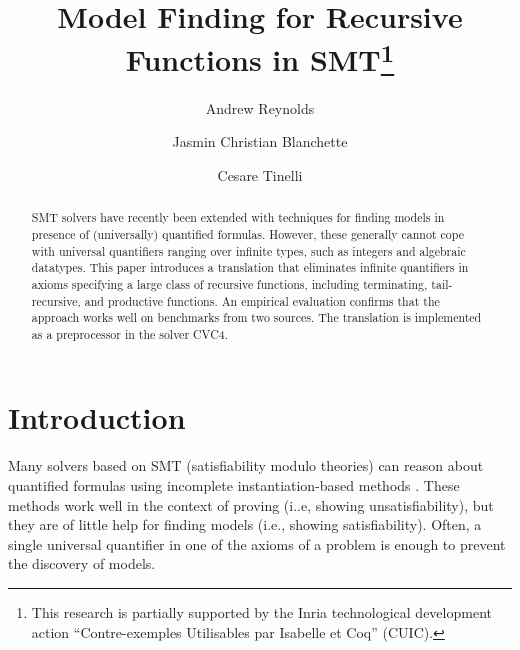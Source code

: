 \documentclass[runningheads,a4paper]{llncs}
\newcommand\cvc{CVC4\xspace}
\newcommand{\rem}[1]{\textcolor{red}{[#1]}}
\newcommand{\ct}[1]{\rem{#1 --ct}}
\begin{document}
\title{Model Finding for Recursive Functions in SMT\thanks{%
This research is partially supported by the Inria technological development
action ``Contre-exemples Utilisables par Isabelle et Coq'' (CUIC).
}
}

\author {Andrew Reynolds \and Jasmin Christian Blanchette \and Cesare Tinelli }

\maketitle

\begin{abstract}
SMT solvers have recently been extended with techniques for finding models
in presence of (universally) quantified formulas.
However, these generally cannot cope with universal quantifiers ranging over
infinite types, such as integers and algebraic datatypes. This paper introduces
a translation that eliminates infinite quantifiers in axioms specifying a large
class of recursive functions, including terminating, tail-recursive, and
productive functions. An empirical evaluation confirms that the approach works
well on benchmarks from two sources. The translation is implemented as a
preprocessor in the solver CVC4.
\end{abstract}

\setcounter{footnote}{0}

\section{Introduction}
\label{sec:introduction}


Many solvers based on SMT (satisfiability modulo theories) can reason about
quantified formulas using incomplete instantiation-based methods
\cite{MouraBjoerner07,ReynoldsTinelliMoura14}.
These methods work well in the context of proving (i..e, showing
unsatisfiability), but they are of little help for finding models (i.e.,
showing satisfiability). Often, a single universal quantifier in one of the
axioms of a problem is enough to prevent the discovery of models.
\end{document}
